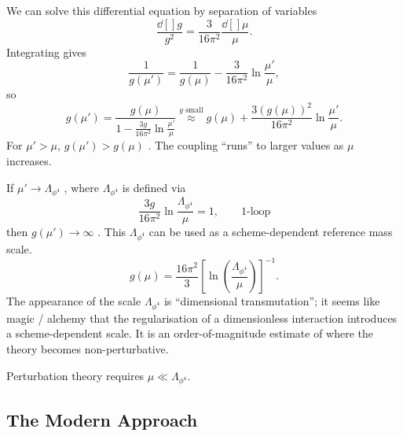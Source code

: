
We can solve this differential equation by separation of variables
\begin{equation}
  \frac{\dd[]{g}}{g^2} = \frac{3}{16 \pi^2} \frac{\dd[]{\mu}}{\mu}.
\end{equation}
Integrating gives
\begin{equation}
  \frac{1}{g(\mu')} = \frac{1}{g(\mu)} - \frac{3}{16 \pi^2} \ln \frac{\mu'}{\mu},
\end{equation}
so 
\begin{equation}
  g(\mu') = \frac{g(\mu)}{1 - \frac{3g}{16 \pi^2} \ln \frac{\mu'}{\mu}} \stackrel{g \text{ small}}{\approx} g(\mu) + \frac{3 (g(\mu))^2}{16 \pi^2} \ln \frac{\mu'}{\mu}.
\end{equation}
For $\mu' > \mu$,  $g(\mu') > g(\mu)$ .
The coupling ``runs'' to larger values as $\mu$  increases.
\begin{remark}
  If $\mu' \to \Lambda_{\phi^4}$ , where $\Lambda_{\phi^4}$  is defined via
  \begin{equation}
    \frac{3g}{16 \pi^2} \ln \frac{\Lambda_{\phi^4}}{\mu} = 1, \qquad \text{1-loop}
  \end{equation}
  then $g(\mu') \to \infty$ . This $\Lambda_{\phi^4}$  can be used as a scheme-dependent reference mass scale.
  \begin{equation}
    g(\mu) = \frac{16\pi^2}{3} \left[\ln(\frac{\Lambda_{\phi^4}}{\mu})\right]^{-1}.
  \end{equation}
  The appearance of the scale $\Lambda_{\phi^4}$ is ``dimensional transmutation''; it seems like magic / alchemy that the regularisation of a dimensionless interaction introduces a scheme-dependent scale.
  It is an order-of-magnitude estimate of where the theory becomes non-perturbative.
\end{remark}
\begin{remark}
  Perturbation theory requires $\mu \ll \Lambda_{\phi^4}$.
\end{remark}

\subsection{The Modern Approach}%
\label{sub:the_modern_approach}


